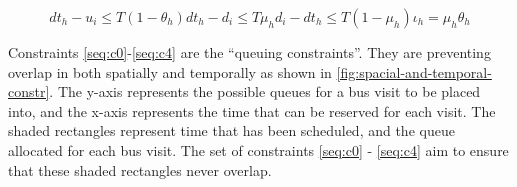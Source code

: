 \documentclass[11pt,a4paper,final]{article}
\begin{document}
\begin{multicols}{2}
\begin{subequations}
  \begin{equation}
      \label{seq:c14}
      dt_h - u_i \le T(1 - \theta_h)
  \end{equation}
  \begin{equation}
      \label{seq:c15}
      dt_h - d_i \le T\mu_h
  \end{equation}
  \begin{equation}
      \label{seq:c16}
      d_i - dt_h \le T(1 - \mu_h)
  \end{equation}
  \begin{equation}
      \label{seq:c17}
      \iota_h = \mu_h \theta_h
  \end{equation}
\end{subequations}
\label{eq:constraints}
\end{multicols}

Constraints \ref{seq:c0}-\ref{seq:c4} are the ``queuing constraints''. They are preventing overlap in both spatially and
temporally as shown in \ref{fig:spacial-and-temporal-constr}. The y-axis represents the possible queues for a bus visit to be
placed into, and the x-axis represents the time that can be reserved for each visit. The shaded rectangles represent
time that has been scheduled, and the queue allocated for each bus visit. The set of constraints \ref{seq:c0} -
\ref{seq:c4} aim to ensure that these shaded rectangles never overlap.
\end{document}
